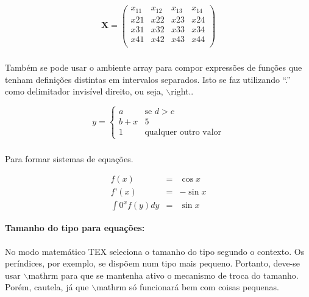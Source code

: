 \documentclass[a4paper, 12pt]{article} %
\begin{document}
\begin{displaymath}
\mathbf{X}= %
\left( \begin{array}{cccc}   %
x_{11} & x_{12} & x_{13} & x_{14}\\ %
x {21} & x {22} & x{23} & x {24}\\ %
x {31} & x {32} & x {33} & x {34}\\
x {41} & x {42} & x {43} & x {44}\\
\end{array}\right)
\end{displaymath}

\subparagraph{} Também se pode usar o ambiente array para compor expressões de funções que tenham definições distintas em intervalos separados. Isto se faz utilizando “.” como delimitador invisível direito, ou seja, $\backslash$right..

\begin{displaymath}
y=\left\{ \begin{array}{ll}
a & \textrm{se $d>c$}\\
b+x & \textrm{5}\\
1 & \textrm{qualquer outro valor}
\end{array}\right.
\end{displaymath}

\subparagraph{} Para formar sistemas de equações.

\begin{eqnarray}
f(x) & = & \cos x \\
f’(x) & = & -\sin x \\
\int {0}^{x} f(y)dy & = & \sin x
\end{eqnarray}

\begin{flushleft}
\textbf{Tamanho do tipo para equações:}
\end{flushleft}

\paragraph{} No modo matemático TEX seleciona o tamanho do tipo segundo o contexto. Os períndices, por exemplo, se dispõem num tipo mais pequeno. Portanto, deve-se usar $\backslash$mathrm para que se mantenha ativo o mecanismo de troca do tamanho. Porém, cautela, já que $\backslash$mathrm só funcionará bem
com coisas pequenas. 
\end{document}
